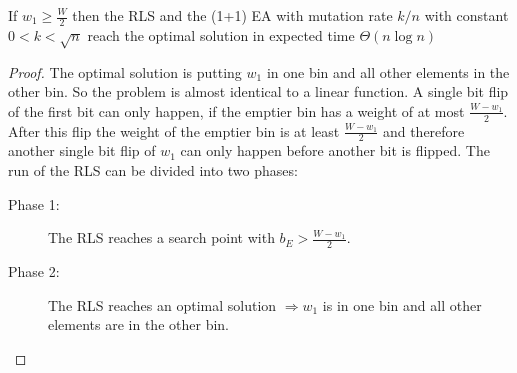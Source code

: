 \begin{theorem}\label{theo:OneMaxResult}
    If $w_1 \ge \frac W 2$  then the RLS and the (1+1) EA with mutation rate $k/n$ with constant $0<k<\sqrt{n}$ reach the optimal solution in expected time $\Theta(n\log{}n)$
\end{theorem}
\begin{proof}
    The optimal solution is putting $w_1$ in one bin and all other elements in the other bin.
    So the problem is almost identical to a linear function.
    A single bit flip of the first bit can only happen, if the emptier bin has a weight of at most $\frac {W-w_1}{2}$.
    After this flip the weight of the emptier bin is at least $\frac {W-w_1}{2}$ and therefore another single bit flip of $w_1$ can only happen before another bit is flipped.
    The run of the RLS can be divided into two phases:
    \begin{description}
        \item[Phase 1:] The RLS reaches a search point with $b_E > \frac {W-w_1}{2}$.
        \item[Phase 2:] The RLS reaches an optimal solution $\Rightarrow w_1$ is in one bin and all other elements are in the other bin.
    \end{description}


\end{proof}
